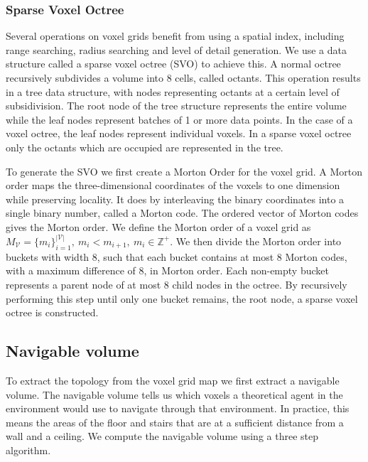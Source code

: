 \documentclass{article}
\begin{document}
\subsubsection{Sparse Voxel Octree}
Several operations on voxel grids benefit from using a spatial index, including range searching, radius searching and level of detail generation. We use a data structure called a sparse voxel octree (SVO) to achieve this. A normal octree recursively subdivides a volume into 8 cells, called octants. This operation results in a tree data structure, with nodes representing octants at a certain level of subsidivision. The root node of the tree structure represents the entire volume while the leaf nodes represent batches of 1 or more data points. In the case of a voxel octree, the leaf nodes represent individual voxels. In a sparse voxel octree only the octants which are occupied are represented in the tree. 

To generate the SVO we first create a Morton Order for the voxel grid. A Morton order maps the three-dimensional coordinates of the voxels to one dimension while preserving locality. It does by interleaving the binary coordinates into a single binary number, called a Morton code. The ordered vector of Morton codes gives the Morton order. We define the Morton order of a voxel grid as \(M_{\mathcal{V}}=\{m_i\}_{i=1}^{|\mathcal{V}|},\ m_i < m_{i+1},\ m_i \in \mathbb{Z^+}\). We then divide the Morton order into buckets with width 8, such that each bucket contains at most 8 Morton codes, with a maximum difference of 8, in Morton order. Each non-empty bucket represents a parent node of at most 8 child nodes in the octree. By recursively performing this step until only one bucket remains, the root node, a sparse voxel octree is constructed. 

\subsection{Navigable volume}
To extract the topology from the voxel grid map we first extract a navigable volume. The navigable volume tells us which voxels a theoretical agent in the environment would use to navigate through that environment. In practice, this means the areas of the floor and stairs that are at a sufficient distance from a wall and a ceiling. We compute the navigable volume using a three step algorithm.
\end{document}
